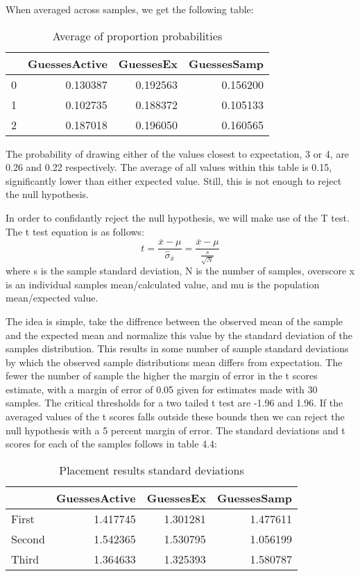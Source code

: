 When averaged across samples, we get the following table:

\begin{table}
\begin{tabular}{lrrr}
\toprule
{} &  GuessesActive &  GuessesEx &  GuessesSamp \\
\midrule
0 &       0.130387 &   0.192563 &     0.156200 \\
1 &       0.102735 &   0.188372 &     0.105133 \\
2 &       0.187018 &   0.196050 &     0.160565 \\
\bottomrule
\end{tabular}
\caption{Average of proportion probabilities}
\end{table}

The probability of drawing either of the values closest to expectation, 3 or 4,
are 0.26 and 0.22 respectively. The average of all values within this table is
0.15, significantly lower than either expected value. Still, this is not enough
to reject the null hypothesis.

In order to confidantly reject the null hypothesis, we will make use of the
T test.  The t test equation is as follows:
$$t =\frac{\overline{x}-\mu}{\hat{\sigma}_{\overline{x}}} = \frac{\overline{x}-\mu}{\frac{s}{\sqrt{N}}}$$
where s is the sample standard deviation, N is the
number of samples, overscore x is an individual samples mean/calculated value,
and mu is the population mean/expected value.

The idea is simple, take the diffrence between the observed mean of the sample
and the expected mean and normalize this value by the standard deviation of the
samples distribution. This results in some number of sample standard deviations
by which the observed sample distributions mean differs from expectation. The
fewer the number of sample the higher the margin of error in the t scores
estimate, with a margin of error of 0.05 given for estimates made with 30
samples. The critical thresholds for a two tailed t test are -1.96 and 1.96.
If the averaged values of the t scores falls outside these bounds then we can
reject the null hypothesis with a 5 percent margin of error. The standard
deviations and t scores for each of the samples follows in table 4.4:

\begin{table}
\begin{tabular}{lrrr}
\toprule
{} &  GuessesActive &  GuessesEx &  GuessesSamp \\
\midrule
First &       1.417745 &   1.301281 &     1.477611 \\
Second &       1.542365 &   1.530795 &     1.056199 \\
Third &       1.364633 &   1.325393 &     1.580787 \\
\bottomrule
\end{tabular}
\caption{Placement results standard deviations}
\end{table}


